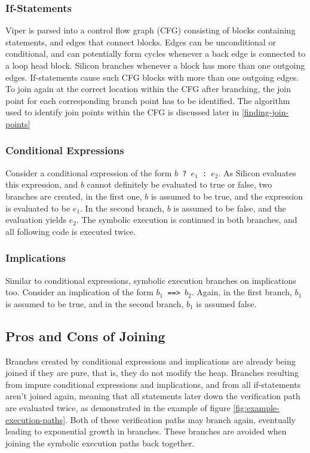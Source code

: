 \documentclass[11pt]{article}
\begin{document}
    \subsubsection{If-Statements} \label{if-statements}

    Viper is parsed into a control flow graph (CFG) consisting of blocks containing
    statements, and edges that connect blocks. Edges can be unconditional or conditional,
    and can potentially form cycles whenever a back edge is connected to a loop head block.
    Silicon branches whenever a block has more than one outgoing edges.
    If-statements cause such CFG blocks with more than one outgoing edges.
    To join again at the correct location within the CFG after branching,
    the join point for each corresponding branch point has to be identified.
    The algorithm used to identify join points within the CFG is discussed later in
    \ref{finding-join-points}

    \subsubsection{Conditional Expressions}

    Consider a conditional expression of the form \texttt{$b$ ? $e_1$ : $e_2$}.
    As Silicon evaluates this expression, and $b$ cannot definitely be evaluated to true or false,
    two branches are created, in the first one, $b$ is assumed to be
    true, and the expression is evaluated to be $e_1$.
    In the second branch, $b$ is assumed to be false, and the evaluation yields $e_2$.
    The symbolic execution is continued in both branches, and all following code
    is executed twice.


    \subsubsection{Implications}

    Similar to conditional expressions, symbolic execution branches on implications too. Consider
    an implication of the form \texttt{$b_1$ ==> $b_2$}. Again, in the first branch, $b_1$ is assumed to be true,
    and in the second branch, $b_1$ is assumed false.

    \subsection{Pros and Cons of Joining}

    Branches created by conditional expressions and implications are already being joined if they are pure,
    that is, they do not modify the heap.
    Branches resulting from impure conditional expressions and implications,
    and from all if-statements aren't joined again, meaning that
    all statements later down the verification path are evaluated twice, as demonstrated
    in the example of figure \ref{fig:example-execution-paths}. Both of these
    verification paths may branch again, eventually leading to exponential growth in branches.
    These branches are avoided when joining the symbolic execution paths back together.
\end{document}
